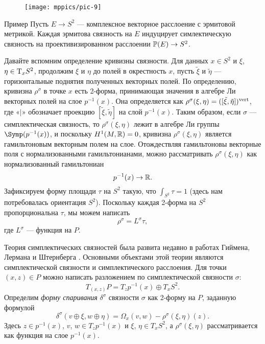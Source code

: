 {

\begin{wrapfigure}[10]{o}{40 mm}
\vskip-0mm
\centering
\texttt{[image: mppics/pic-9]}
\caption{}\label{pic-9}
\vskip0mm
\end{wrapfigure}

\begin{ex*}{Пример}
  Пусть $E \to S^2$ --- комплексное векторное расслоение с эрмитовой
  метрикой.  Каждая эрмитова связность на $E$ индуцирует
  симлектическую связность на проективизированном расслоении $\mathbb{P}(E)
  \to S^2$.
\end{ex*}

Давайте вспомним определение кривизны связности.
Для данных $x\in S^2$ и $\xi$, $\eta \z\in \T_x S^2$, продолжим $\xi$ и $\eta$ до полей в окрестность $x$,
пусть $\tilde\xi$ и $\tilde\eta$ --- горизонтальные поднятия
полученных векторных полей. 
По определению, кривизна $\rho^\sigma$ в точке $x$ есть 2-форма,
принимающая значения в алгебре Ли векторных полей на слое
$p^{-1}(x)$. 
Она определяется как $\rho^\sigma (\xi, \eta) \z= ([\tilde\xi,
  \tilde\eta])^\vert$, где «$\vert$» обозначает проекцию $[\tilde\xi,
  \tilde\eta]$ на слой $p^{-1} (x)$. 
Таким образом, если $\sigma$ --- симплектическая связность, то
$\rho^\sigma (\xi, \eta)$ лежит в алгебре Ли группы
$\Symp(p^{-1}(x))$, и поскольку $H^1 (M, \mathbb{R}) = 0$, кривизна
$\rho^\sigma (\xi, \eta)$ является гамильтоновым векторным полем на
слое. 
Отождествляя гамильтоновы векторные поля с нормализованными
гамильтонианами, можно рассматривать $\rho^\sigma (\xi, \eta)$ как
нормализованный гамильтониан 
\[p^{-1} (x) \to \mathbb{R}.\]
Зафиксируем форму площади $\tau$ на $S^2$ такую, что $\int_{S^2} \tau
= 1$ (здесь нам потребовалась ориентация $S^2$). 
Поскольку каждая 2-форма на $S^2$ 
пропорциональна $\tau$, мы можем написать
\[\rho^\sigma = L^\sigma \tau,\]
где $L^\sigma$ --- функция на $P$.

}

Теория симплектических связностей была развита недавно в работах
Гиймена, Лермана и Штернберга \cite{GLS,MS}. 
Основными объектами этой теории являются  симплектической связности и  симплектического расслоения. 
Для точки $(x, z) \in P$ можно написать разложением по симплектической
связности $\sigma$: 
\[T_{(x,z)} P = T_z p^{-1} (x) \oplus T_x S^2.\]
Определим \emph{форму спаривания} $\delta^\sigma$ связности $\sigma$
как 2-форму на $P$, заданную формулой  
\[\delta^\sigma (v \oplus \xi, w \oplus \eta) = \Omega_x (v, w) -
\rho^\sigma (\xi, \eta)(z).\] 
Здесь $z \in p^{-1} (x)$, $v$, $w \in T_z p^{-1} (x)$ и $\xi$, $\eta
\in T_x S^2$, а $\rho^\sigma (\xi, \eta)$ рассматривается как функция
на слое $p^{-1} (x)$. 

